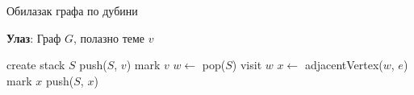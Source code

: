 \begin{algorithm}[H]
\caption{Обилазак графа по дубини}
\label{algorithm:dfs-traversal-pseudo}
\hspace*{\algorithmicindent} \textbf{Улаз}: Граф $G$, полазно теме $v$
\begin{algorithmic}[1]
\State create stack $S$
\State push($S$, $v$)
\State mark $v$
\State $w \gets$ pop($S$)
\State visit $w$
\State $x \gets$ adjacentVertex($w$, $e$)
\State mark $x$
\State push($S$, $x$)
\EndIf
\EndFor
\EndWhile
\EndProcedure
\end{algorithmic}
\end{algorithm}